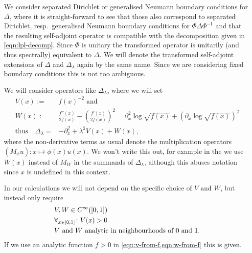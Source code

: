 We consider separated Dirichlet or generalised Neumann boundary conditions for
$\Delta$, where it is straight-forward to see that those also correspond to
separated Dirichlet, resp.\ generalised Neumann boundary conditions for
$\Phi\Delta\Phi^{-1}$ and that the resulting self-adjoint operator is compatible
with the decomposition given in \cref{eqn:lpl-decomp}. Since $\Phi$ is unitary
the transformed operator is unitarily (and thus spectrally) equivalent to
$\Delta$. We will denote the transformed self-adjoint extensions of $\Delta$ and
$\Delta_\lambda$ again by the same name. Since we are considering fixed boundary
conditions this is not too ambiguous.

We will consider operators like $\Delta_\lambda$, where we will set
\begin{align}
  \label{eqn:v-from-f}
  V(x) :={}& f(x)^{-2} \text{ and } \\
  \label{eqn:w-from-f}
  W(x) :={}& \frac{f''(x)}{2f(x)} - \left(\frac{f'(x)}{2f(x)}\right)^2 =
    \partial_x^2 \log\sqrt{f(x)} + \left(\partial_x \log\sqrt{f(x)}\right)^2 \\
  \label{eqn:d_lambda}
  \text{thus}\quad \Delta_\lambda = {}& -\partial^2_x + \lambda^2 V(x) + W(x),
\end{align}
where the non-derivative terms as usual denote the multiplication operators
$(M_\phi u)\colon x \mapsto \phi(x)u(x)$. We won't write this out, for example
in the we use $W(x)$ instead of $M_W$ in the summands of $\Delta_\lambda$,
although this abuses notation since $x$ is undefined in this context.

In our calculations we will not depend on the specific choice of $V$ and $W$,
but instead only require
\begin{equation*}
  \begin{split}
    &V,W\in C^\infty_{}([0,1]) \\
    &\forall_{x\in[0,1]}\colon V(x) > 0 \\
    &V\text{ and }W\text{ analytic in neighbourhoods of $0$ and $1$}.
  \end{split}
\end{equation*}
If we use an analytic function $f>0$ in \cref{eqn:v-from-f,eqn:w-from-f} this is
given.

